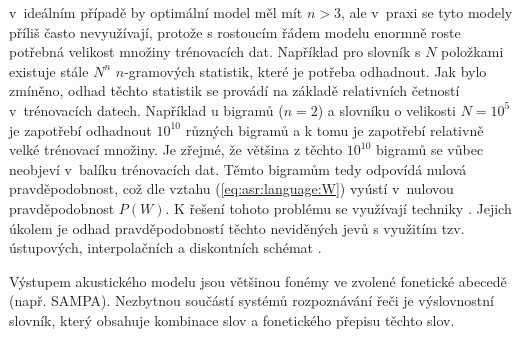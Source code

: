 \noindent v~ideálním případě by optimální model měl mít $n > 3$, ale v~praxi se tyto modely příliš často nevyužívají, protože s rostoucím řádem modelu enormně roste potřebná velikost množiny trénovacích dat. Například pro slovník s $N$ položkami existuje stále $N^{n}$ $n$-gramových statistik, které je potřeba odhadnout. Jak bylo zmíněno, odhad těchto statistik se provádí na základě relativních četností v~trénovacích datech. Například u bigramů ($n=2$) a slovníku o velikosti $N=10^{5}$ je zapotřebí odhadnout $10^{10}$ různých bigramů a k tomu je zapotřebí relativně velké trénovací množiny. Je zřejmé, že většina z těchto $10^{10}$ bigramů se vůbec neobjeví v~balíku trénovacích dat. Těmto  bigramům tedy odpovídá nulová pravděpodobnost, což dle vztahu (\ref{eq:asr:language:W}) vyústí v~nulovou pravděpodobnost $P\left(W\right)$. K řešení tohoto problému se využívají techniky . Jejich úkolem je odhad pravděpodobností těchto neviděných jevů s využitím tzv. ústupových, interpolačních a diskontních schémat \cite{Psutka2006}.

Výstupem akustického modelu jsou většinou fonémy ve zvolené fonetické abecedě (např. SAMPA). Nezbytnou součástí systémů rozpoznávání řeči je výslovnostní slovník, který obsahuje kombinace slov a fonetického přepisu těchto slov.
